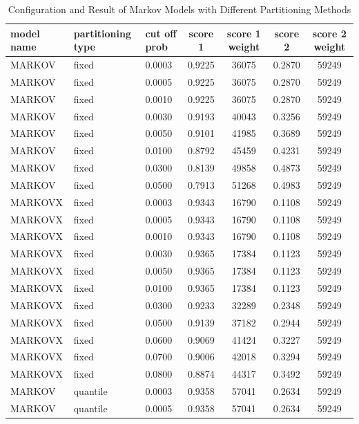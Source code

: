 \documentclass{article}
\begin{document}
\begin{longtable}[htbp]{l|l|l|*{4}{c}}
    \caption{Configuration and Result of Markov Models with Different Partitioning Methods}
    \label{tab:tab1.3.4}\\
    \textbf{model name} & \textbf{partitioning type} & \textbf{cut off prob} & \textbf{score 1} & \textbf{score 1 weight} & \textbf{score 2} & \textbf{score 2 weight} \\
    \hline
    MARKOV & fixed & 0.0003 & 0.9225 & 36075 & 0.2870 & 59249\\
    MARKOV & fixed & 0.0005 & 0.9225 & 36075 & 0.2870 & 59249\\
    MARKOV & fixed & 0.0010 & 0.9225 & 36075 & 0.2870 & 59249\\
    MARKOV & fixed & 0.0030 & 0.9193 & 40043 & 0.3256 & 59249\\
    MARKOV & fixed & 0.0050 & 0.9101 & 41985 & 0.3689 & 59249\\
    MARKOV & fixed & 0.0100 & 0.8792 & 45459 & 0.4231 & 59249\\
    MARKOV & fixed & 0.0300 & 0.8139 & 49858 & 0.4873 & 59249\\
    MARKOV & fixed & 0.0500 & 0.7913 & 51268 & 0.4983 & 59249\\
    MARKOVX & fixed & 0.0003 & 0.9343 & 16790 & 0.1108 & 59249\\
    MARKOVX & fixed & 0.0005 & 0.9343 & 16790 & 0.1108 & 59249\\
    MARKOVX & fixed & 0.0010 & 0.9343 & 16790 & 0.1108 & 59249\\
    MARKOVX & fixed & 0.0030 & 0.9365 & 17384 & 0.1123 & 59249\\
    MARKOVX & fixed & 0.0050 & 0.9365 & 17384 & 0.1123 & 59249\\
    MARKOVX & fixed & 0.0100 & 0.9365 & 17384 & 0.1123 & 59249\\
    MARKOVX & fixed & 0.0300 & 0.9233 & 32289 & 0.2348 & 59249\\
    MARKOVX & fixed & 0.0500 & 0.9139 & 37182 & 0.2944 & 59249\\
    MARKOVX & fixed & 0.0600 & 0.9069 & 41424 & 0.3227 & 59249\\
    MARKOVX & fixed & 0.0700 & 0.9006 & 42018 & 0.3294 & 59249\\
    MARKOVX & fixed & 0.0800 & 0.8874 & 44317 & 0.3492 & 59249\\
    MARKOV & quantile & 0.0003 & 0.9358 & 57041 & 0.2634 & 59249\\
    MARKOV & quantile & 0.0005 & 0.9358 & 57041 & 0.2634 & 59249\\

\end{longtable}
\end{document}
